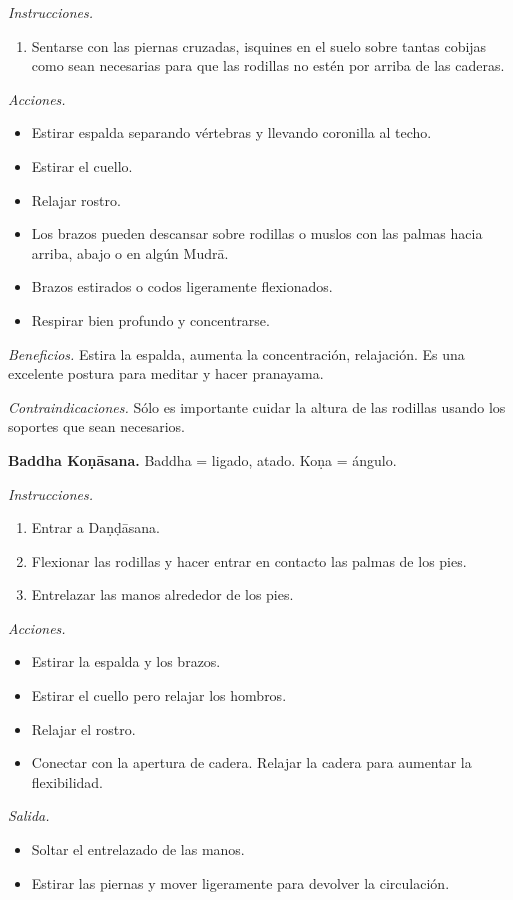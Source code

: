 \emph{Instrucciones.}
\begin{enumerate}
\item Sentarse con las piernas cruzadas,
isquines en el suelo sobre tantas cobijas
como sean necesarias para que las rodillas no
estén por arriba de las caderas.
\end{enumerate}

\emph{Acciones.}
\begin{itemize}
\item Estirar espalda separando vértebras y
llevando coronilla al techo.
\item Estirar el cuello.
\item Relajar rostro.
\item Los brazos pueden descansar sobre
rodillas o muslos con las palmas hacia
arriba, abajo o en algún Mudrā.
\item Brazos estirados o codos ligeramente
flexionados.
\item Respirar bien profundo y concentrarse.
\end{itemize}

\emph{Beneficios.} Estira la espalda, aumenta
la concentración, relajación. Es una
excelente postura para meditar y hacer
pranayama.

\emph{Contraindicaciones.} Sólo es importante
cuidar la altura de las rodillas usando los
soportes que sean necesarios.

\medskip\noindent\textbf{Baddha Koṇāsana.}
Baddha = ligado, atado. Koṇa = ángulo.

\emph{Instrucciones.}
\begin{enumerate}
\item Entrar a Daṇḍāsana.
\item Flexionar las rodillas y hacer entrar
en contacto las palmas de los pies.
\item Entrelazar las manos alrededor de los
pies.
\end{enumerate}

\emph{Acciones.}
\begin{itemize}
\item Estirar la espalda y los brazos.
\item Estirar el cuello pero relajar los
hombros.
\item Relajar el rostro.
\item Conectar con la apertura de cadera.
Relajar la cadera para aumentar la
flexibilidad.
\end{itemize}

\emph{Salida.}
\begin{itemize}
\item Soltar el entrelazado de las manos.
\item Estirar las piernas y mover ligeramente
para devolver la circulación.
\end{itemize}

